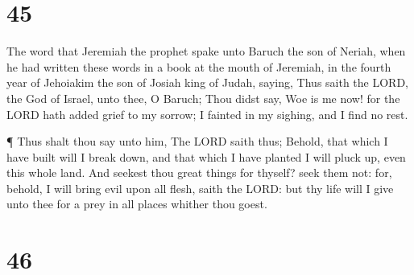 \hypertarget{section-44}{%
\section{45}\label{section-44}}

 The word that Jeremiah the prophet spake unto Baruch the
son of Neriah, when he had written these words in a book at the mouth of
Jeremiah, in the fourth year of Jehoiakim the son of Josiah king of
Judah, saying,  Thus saith the LORD, the God of Israel, unto
thee, O Baruch;  Thou didst say, Woe is me now! for the LORD
hath added grief to my sorrow; I fainted in my sighing, and I find no
rest.

 ¶ Thus shalt thou say unto him, The LORD saith thus;
Behold, that which I have built will I break down, and that which I have
planted I will pluck up, even this whole land.  And seekest
thou great things for thyself? seek them not: for, behold, I will bring
evil upon all flesh, saith the LORD: but thy life will I give unto thee
for a prey in all places whither thou goest.

\hypertarget{section-45}{%
\section{46}\label{section-45}}

